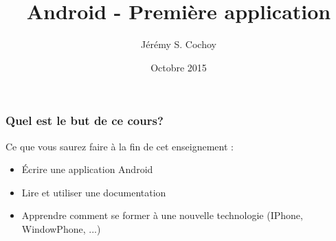 \documentclass{beamer}
\begin{document}
\title{Android - Première application}
\author{Jérémy S. Cochoy}
\date{Octobre 2015}


\begin{frame}
\titlepage
\end{frame}

\begin{frame}
\tableofcontents
\end{frame}

\begin{frame}
\frametitle{Quel est le but de ce cours?}

\begin{block}{Ce que vous saurez faire à la fin de cet enseignement :}

	\begin{itemize}
		\item Écrire une application Android
		\item Lire et utiliser une documentation
		\item Apprendre comment se former à une nouvelle technologie (IPhone, WindowPhone, ...)
	\end{itemize}

\end{block}

\end{frame}
\end{document}
